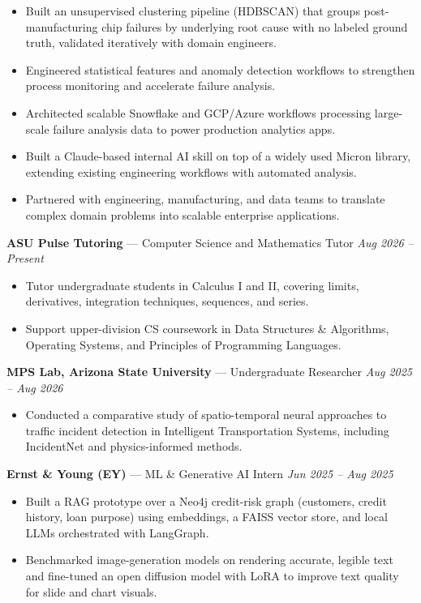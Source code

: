 \documentclass[a4paper,8pt]{extarticle}
\begin{document}
\begin{itemize}
\item Built an unsupervised clustering pipeline (HDBSCAN) that groups post-manufacturing chip failures by underlying root cause with no labeled ground truth, validated iteratively with domain engineers.
\item Engineered statistical features and anomaly detection workflows to strengthen process monitoring and accelerate failure analysis.
\item Architected scalable Snowflake and GCP/Azure workflows processing large-scale failure analysis data to power production analytics apps.
\item Built a Claude-based internal AI skill on top of a widely used Micron library, extending existing engineering workflows with automated analysis.
\item Partnered with engineering, manufacturing, and data teams to translate complex domain problems into scalable enterprise applications.
\end{itemize}

\noindent
\textbf{ASU Pulse Tutoring} --- Computer Science and Mathematics Tutor
\hfill \textit{Aug 2026 -- Present}

\begin{itemize}
\item Tutor undergraduate students in Calculus I and II, covering limits, derivatives, integration techniques, sequences, and series.
\item Support upper-division CS coursework in Data Structures \& Algorithms, Operating Systems, and Principles of Programming Languages.
\end{itemize}

\noindent
\textbf{MPS Lab, Arizona State University} --- Undergraduate Researcher
\hfill \textit{Aug 2025 -- Aug 2026}

\begin{itemize}
\item Conducted a comparative study of spatio-temporal neural approaches to traffic incident detection in Intelligent Transportation Systems, including IncidentNet and physics-informed methods.
\end{itemize}

\noindent
\textbf{Ernst \& Young (EY)} --- ML \& Generative AI Intern
\hfill \textit{Jun 2025 -- Aug 2025}

\begin{itemize}
\item Built a RAG prototype over a Neo4j credit-risk graph (customers, credit history, loan purpose) using embeddings, a FAISS vector store, and local LLMs orchestrated with LangGraph.
\item Benchmarked image-generation models on rendering accurate, legible text and fine-tuned an open diffusion model with LoRA to improve text quality for slide and chart visuals.
\end{itemize}
\end{document}
